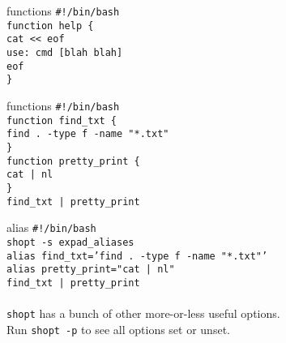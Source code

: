 \documentclass{beamer}
\let\tt\texttt
\begin{document}
\begin{frame}{functions}
        \tt{\#!/bin/bash}               \\
        \tt{function help \{ }      \\
        \quad \tt{cat << eof}       \\
        \tt{use: cmd [blah blah]}   \\
        \tt{eof}                    \\
        \tt{\}}                     \\
\end{frame}

\begin{frame}{functions}
        \tt{\#!/bin/bash}               \\
        \tt{function find\_txt \{ }                 \\
        \quad \tt{find . -type f -name "*.txt"}     \\
        \tt{\}}                                     \\
        \tt{function pretty\_print \{ }             \\
        \quad \tt{cat | nl}                         \\
        \tt{\}}                                     \\
        \tt{find\_txt | pretty\_print}              \\
\end{frame}

\begin{frame}{alias}
        \tt{\#!/bin/bash}                                   \\
        \tt{shopt -s expad\_aliases}                        \\
        \tt{alias find\_txt='find . -type f -name "*.txt"'} \\
        \tt{alias pretty\_print="cat | nl"}                 \\
        \tt{find\_txt | pretty\_print}                      \\
        \quad                                               \\
        \tt{shopt} has a bunch of other more-or-less useful options.    \\
        Run \tt{shopt -p} to see all options set or unset.
\end{frame}
\end{document}

